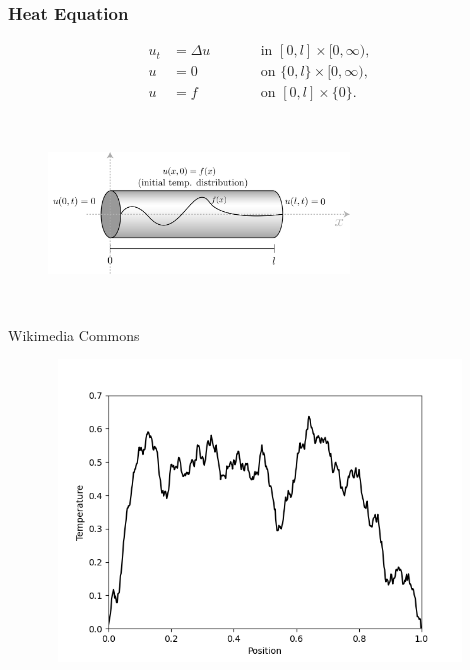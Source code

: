\documentclass{beamer}
\begin{document}
\begin{frame}
\frametitle{Heat Equation}
\begin{subequations}
  \begin{align*}
    u_t &= \Delta u &&\qquad \text{in } [0,l] \times [0,\infty),\\
    u &= 0 &&\qquad \text{on } \{0, l\} \times [0,\infty),\\
    u &= f &&\qquad \text{on }[0,l] \times \{0\}.
  \end{align*}
\end{subequations}

\begin{figure}
  \centering
  \includegraphics[width=8cm,height=5cm]{heat_rod.png} 
\end{figure}

\footnotesize{Wikimedia Commons}
\end{frame}


\begin{frame}
  \begin{figure}
    \centering
    \href{run:forward_heat_equation.mp4}{\includegraphics[width=12cm,height=8cm]{forward_heat_equation.png}}    
    
  \end{figure}
\end{frame}
\end{document}
